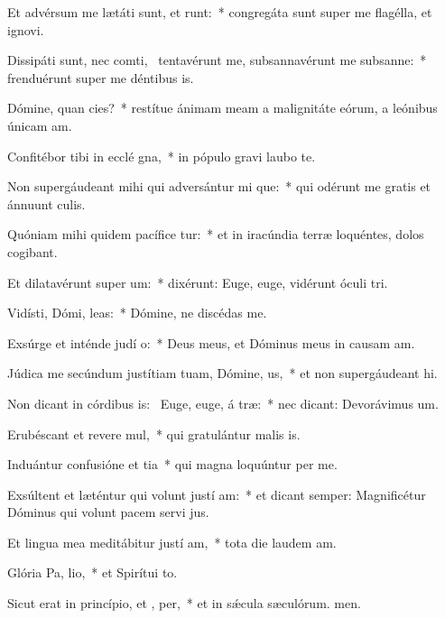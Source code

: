 \item Et advérsum me lætáti sunt, et runt:~* congregáta sunt super me flagélla, et ignovi.
\item Dissipáti sunt, nec comti,~\pscross{} tentavérunt me, subsannavérunt me subsanne:~* frenduérunt super me déntibus is.
\item Dómine, quan cies?~* restítue ánimam meam a malignitáte eórum, a leónibus únicam am.
\item Confitébor tibi in ecclé gna,~* in pópulo gravi laubo te.
\item Non supergáudeant mihi qui adversántur mi que:~* qui odérunt me gratis et ánnuunt culis.
\item Quóniam mihi quidem pacífice tur:~* et in iracúndia terræ loquéntes, dolos cogibant.
\item Et dilatavérunt super   um:~* dixérunt: Euge, euge, vidérunt óculi tri.
\item Vidísti, Dómi,  leas:~* Dómine, ne discédas  me.
\item Exsúrge et inténde judí o:~* Deus meus, et Dóminus meus in causam am.
\item Júdica me secúndum justítiam tuam, Dómine,  us,~* et non supergáudeant hi.
\item Non dicant in córdibus is:~\pscross{} Euge, euge, á træ:~* nec dicant: Devorávimus um.
\item Erubéscant et revere mul,~* qui gratulántur malis is.
\item Induántur confusióne et tia~* qui magna loquúntur per me.
\item Exsúltent et læténtur qui volunt justí am:~* et dicant semper: Magnificétur Dóminus qui volunt pacem servi jus.
\item Et lingua mea meditábitur justí am,~* tota die laudem am.
\item Glória Pa,  lio,~* et Spirítui to.
\item Sicut erat in princípio, et ,  per,~* et in sǽcula sæculórum. men.
